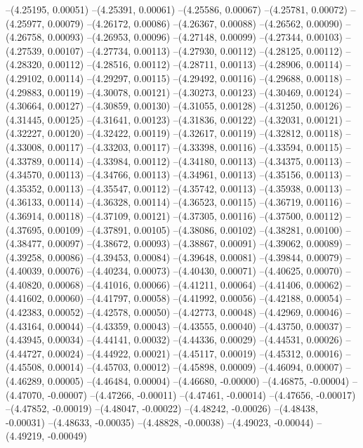 --(4.25195, 0.00051)
--(4.25391, 0.00061)
--(4.25586, 0.00067)
--(4.25781, 0.00072)
--(4.25977, 0.00079)
--(4.26172, 0.00086)
--(4.26367, 0.00088)
--(4.26562, 0.00090)
--(4.26758, 0.00093)
--(4.26953, 0.00096)
--(4.27148, 0.00099)
--(4.27344, 0.00103)
--(4.27539, 0.00107)
--(4.27734, 0.00113)
--(4.27930, 0.00112)
--(4.28125, 0.00112)
--(4.28320, 0.00112)
--(4.28516, 0.00112)
--(4.28711, 0.00113)
--(4.28906, 0.00114)
--(4.29102, 0.00114)
--(4.29297, 0.00115)
--(4.29492, 0.00116)
--(4.29688, 0.00118)
--(4.29883, 0.00119)
--(4.30078, 0.00121)
--(4.30273, 0.00123)
--(4.30469, 0.00124)
--(4.30664, 0.00127)
--(4.30859, 0.00130)
--(4.31055, 0.00128)
--(4.31250, 0.00126)
--(4.31445, 0.00125)
--(4.31641, 0.00123)
--(4.31836, 0.00122)
--(4.32031, 0.00121)
--(4.32227, 0.00120)
--(4.32422, 0.00119)
--(4.32617, 0.00119)
--(4.32812, 0.00118)
--(4.33008, 0.00117)
--(4.33203, 0.00117)
--(4.33398, 0.00116)
--(4.33594, 0.00115)
--(4.33789, 0.00114)
--(4.33984, 0.00112)
--(4.34180, 0.00113)
--(4.34375, 0.00113)
--(4.34570, 0.00113)
--(4.34766, 0.00113)
--(4.34961, 0.00113)
--(4.35156, 0.00113)
--(4.35352, 0.00113)
--(4.35547, 0.00112)
--(4.35742, 0.00113)
--(4.35938, 0.00113)
--(4.36133, 0.00114)
--(4.36328, 0.00114)
--(4.36523, 0.00115)
--(4.36719, 0.00116)
--(4.36914, 0.00118)
--(4.37109, 0.00121)
--(4.37305, 0.00116)
--(4.37500, 0.00112)
--(4.37695, 0.00109)
--(4.37891, 0.00105)
--(4.38086, 0.00102)
--(4.38281, 0.00100)
--(4.38477, 0.00097)
--(4.38672, 0.00093)
--(4.38867, 0.00091)
--(4.39062, 0.00089)
--(4.39258, 0.00086)
--(4.39453, 0.00084)
--(4.39648, 0.00081)
--(4.39844, 0.00079)
--(4.40039, 0.00076)
--(4.40234, 0.00073)
--(4.40430, 0.00071)
--(4.40625, 0.00070)
--(4.40820, 0.00068)
--(4.41016, 0.00066)
--(4.41211, 0.00064)
--(4.41406, 0.00062)
--(4.41602, 0.00060)
--(4.41797, 0.00058)
--(4.41992, 0.00056)
--(4.42188, 0.00054)
--(4.42383, 0.00052)
--(4.42578, 0.00050)
--(4.42773, 0.00048)
--(4.42969, 0.00046)
--(4.43164, 0.00044)
--(4.43359, 0.00043)
--(4.43555, 0.00040)
--(4.43750, 0.00037)
--(4.43945, 0.00034)
--(4.44141, 0.00032)
--(4.44336, 0.00029)
--(4.44531, 0.00026)
--(4.44727, 0.00024)
--(4.44922, 0.00021)
--(4.45117, 0.00019)
--(4.45312, 0.00016)
--(4.45508, 0.00014)
--(4.45703, 0.00012)
--(4.45898, 0.00009)
--(4.46094, 0.00007)
--(4.46289, 0.00005)
--(4.46484, 0.00004)
--(4.46680, -0.00000)
--(4.46875, -0.00004)
--(4.47070, -0.00007)
--(4.47266, -0.00011)
--(4.47461, -0.00014)
--(4.47656, -0.00017)
--(4.47852, -0.00019)
--(4.48047, -0.00022)
--(4.48242, -0.00026)
--(4.48438, -0.00031)
--(4.48633, -0.00035)
--(4.48828, -0.00038)
--(4.49023, -0.00044)
--(4.49219, -0.00049)
